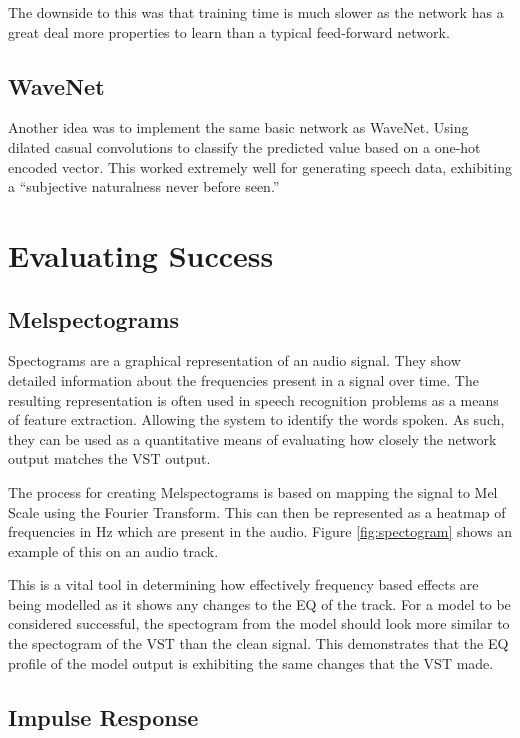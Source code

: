\documentclass{l4proj}
\begin{document}
The downside to this was that training time is much slower as the
network has a great deal more properties to learn than a typical
feed-forward network.

\subsection{WaveNet}\label{wavenet-1}

Another idea was to implement the same basic network as WaveNet. Using
dilated casual convolutions to classify the predicted value based on a
one-hot encoded vector. This worked extremely well for generating speech
data, exhibiting a ``subjective naturalness never before seen.''

\section{Evaluating Success}\label{evaluating-success}

\subsection{Melspectograms}\label{melspectograms}

Spectograms are a graphical representation of an audio signal. They show
detailed information about the frequencies present in a signal over
time. The resulting representation is often used in speech recognition
problems as a means of feature extraction. Allowing the system to
identify the words spoken. As such, they can be used as a quantitative
means of evaluating how closely the network output matches the VST
output.

The process for creating Melspectograms is based on mapping the signal
to Mel Scale using the Fourier Transform. This can then be represented
as a heatmap of frequencies in Hz which are present in the audio. Figure
\ref{fig:spectogram} shows an example of this on an audio track.

This is a vital tool in determining how effectively frequency based
effects are being modelled as it shows any changes to the EQ of the
track. For a model to be considered successful, the spectogram from the
model should look more similar to the spectogram of the VST than the
clean signal. This demonstrates that the EQ profile of the model output
is exhibiting the same changes that the VST made.

\subsection{Impulse Response}\label{impulse-response}
\end{document}
